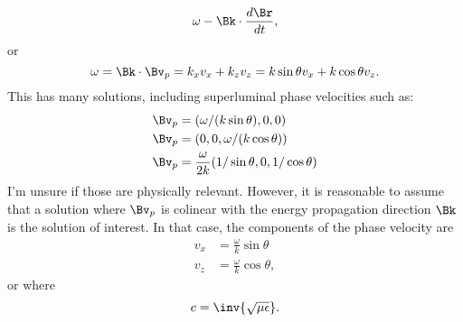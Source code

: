 {{\begin{dmath}
\omega - \Bk \cdot \frac{d\Br}{dt},
\end{dmath}
or
\begin{dmath}\label{eqn:emtproblemSet6Problem3:380}
\omega =
\Bk \cdot \Bv_p
=
k_x v_x
+
k_z v_z
=
k \sin\theta v_x
+
k \cos\theta v_z.
\end{dmath}
This has many solutions, including superluminal phase velocities such as:
\begin{equation}\label{eqn:emtproblemSet6Problem3:420}
\begin{aligned}
\Bv_p &= (\omega/(k\sin\theta), 0, 0) \\
\Bv_p &= (0, 0, \omega/(k\cos\theta)) \\
\Bv_p &= \frac{\omega}{2 k}(1/\sin\theta, 0, 1/\cos\theta)
\end{aligned}
\end{equation}
I'm unsure if those are physically relevant.  However,
it is reasonable to assume that a solution where \( \Bv_p \) is colinear with the energy propagation direction \( \Bk \) is the solution of interest.  In that case, the components of the phase velocity are
\begin{equation}\label{eqn:emtproblemSet6Problem3:320}
\begin{aligned}
v_x &= \frac{\omega}{k}\sin\theta \\
v_z &= \frac{\omega}{k}\cos\theta,
\end{aligned}
\end{equation}
or
where
\begin{dmath}\label{eqn:emtproblemSet6Problem3:360}
c = \inv{\sqrt{\mu \epsilon}}.
\end{dmath}
}}
